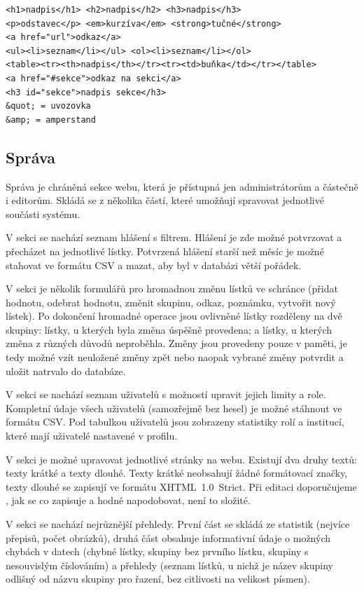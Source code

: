 \begin{verbatim}
<h1>nadpis</h1> <h2>nadpis</h2> <h3>nadpis</h3>
<p>odstavec</p> <em>kurzíva</em> <strong>tučné</strong>
<a href="url">odkaz</a>
<ul><li>seznam</li></ul> <ol><li>seznam</li></ol>
<table><tr><th>nadpis</th></tr><tr><td>buňka</td></tr></table>
<a href="#sekce">odkaz na sekci</a>
<h3 id="sekce">nadpis sekce</h3>
&quot; = uvozovka
&amp; = amperstand
\end{verbatim}

\subsection{Správa}

Správa je chráněná sekce webu, která je přístupná jen administrátorům a částečně i editorům. Skládá se z několika částí, které umožňují spravovat jednotlivé součásti systému. 

V sekci  se nachází seznam hlášení s filtrem. Hlášení je zde možné potvrzovat a přecházet na jednotlivé lístky. Potvrzená hlášení starší než měsíc je možné stahovat ve formátu CSV a mazat, aby byl v databázi větší pořádek.

V sekci  je několik formulářů pro hromadnou změnu lístků ve schránce (přidat hodnotu, odebrat hodnotu, změnit skupinu, odkaz, poznámku, vytvořit nový lístek). Po dokončení hromadné operace jsou ovlivněné lístky rozděleny na dvě skupiny: lístky, u kterých byla změna úspěšně provedena; a lístky, u kterých změna z různých důvodů neproběhla. Změny jsou provedeny pouze v paměti, je tedy možné vzít neuložené změny zpět nebo naopak vybrané změny potvrdit a uložit natrvalo do databáze.

V sekci  se nachází seznam uživatelů s možností upravit jejich limity a role. Kompletní údaje všech uživatelů (samozřejmě bez hesel) je možné stáhnout ve formátu CSV. Pod tabulkou uživatelů jsou zobrazeny statistiky rolí a institucí, které mají uživatelé nastavené v profilu.

V sekci  je možné upravovat jednotlivé stránky na webu. Existují dva druhy textů: texty krátké a texty dlouhé. Texty krátké neobsahují žádné formátovací značky, texty dlouhé se zapisují ve formátu XHTML~1.0~Strict. Při editaci doporučujeme , jak se co zapisuje a hodně napodobovat, není to složité.

V sekci  se nachází nejrůznější přehledy. První část se skládá ze statistik (nejvíce přepisů, počet obrázků), druhá část obsahuje informativní údaje o možných chybách v datech (chybné lístky, skupiny bez prvního lístku, skupiny s nesouvislým číslováním) a přehledy (seznam lístků, u nichž je název skupiny odlišný od názvu skupiny pro řazení, bez citlivosti na velikost písmen).

